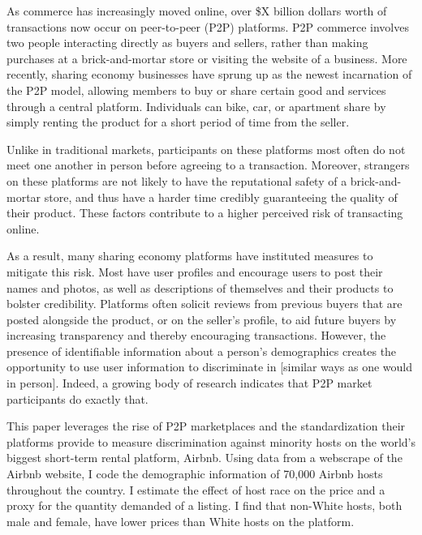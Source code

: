


As commerce has increasingly moved online, over \$X billion dollars worth of transactions now occur on peer-to-peer (P2P) platforms. P2P commerce involves two people interacting directly as buyers and sellers, rather than making purchases at a brick-and-mortar store or visiting the website of a business. More recently, sharing economy businesses have sprung up as the newest incarnation of the P2P model, allowing members to buy or share certain good and services through a central platform. Individuals can bike, car, or apartment share by simply renting the product for a short period of time from the seller. 

Unlike in traditional markets, participants on these platforms most often do not meet one another in person before agreeing to a transaction. Moreover, strangers on these platforms are not likely to have the reputational safety of a brick-and-mortar store, and thus have a harder time credibly guaranteeing the quality of their product. These factors contribute to a higher perceived risk of transacting online. 

As a result, many sharing economy platforms have instituted measures to mitigate this risk. Most have user profiles and encourage users to post their names and photos, as well as descriptions of themselves and their products to bolster credibility. Platforms often solicit reviews from previous buyers that are posted alongside the product, or on the seller's profile, to aid future buyers by increasing transparency and thereby encouraging transactions. However, the presence of identifiable information about a person’s demographics creates the opportunity to use user information to discriminate in [similar ways as one would in person]. Indeed, a growing body of research indicates that P2P market participants do exactly that. 


This paper leverages the rise of P2P marketplaces and the standardization their platforms provide to measure discrimination against minority hosts on the world's biggest short-term rental platform, Airbnb. Using data from a webscrape of the Airbnb website, I code the demographic information of 70,000 Airbnb hosts throughout the country. I estimate the effect of host race on the price and a proxy for the quantity demanded of a listing. I find that non-White hosts, both male and female, have lower prices than White hosts on the platform. 

